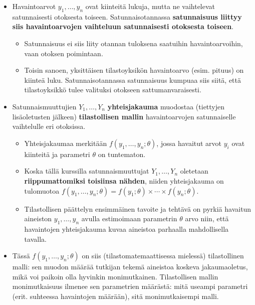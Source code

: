 \documentclass[
]{book}
\providecommand{\tightlist}{%
  \setlength{\itemsep}{0pt}\setlength{\parskip}{0pt}}
\begin{document}
\begin{itemize}
\tightlist
\item
  Havaintoarvot \(y_1, \dots, y_n\) ovat kiinteitä lukuja, mutta ne vaihtelevat satunnaisesti otoksesta toiseen. Satunnaisotannassa \textbf{satunnaisuus liittyy siis havaintoarvojen vaihteluun satunnaisesti otoksesta toiseen}.

  \begin{itemize}
  \tightlist
  \item
    Satunnaisuus ei siis liity otannan tuloksena saatuihin havaintoarvoihin, vaan otoksen poimintaan.
  \item
    Toisin sanoen, yksittäisen tilastoyksikön havaintoarvo (esim. pituus) on kiinteä luku. Satunnaisotannassa satunnaisuus kumpuaa siis siitä, että tilastoyksikkö tulee valituksi otokseen sattumanvaraisesti.
  \end{itemize}
\item
  Satunnaismuuttujien \(Y_1, \ldots, Y_n\) \textbf{yhteisjakauma} muodostaa (tiettyjen lisäoletusten jälkeen) \textbf{tilastollisen mallin} havaintoarvojen satunnaiselle vaihtelulle eri otoksissa.

  \begin{itemize}
  \tightlist
  \item
    Yhteisjakaumaa merkitään \(f(y_1,\dots,y_n;\theta)\), jossa havaitut arvot \(y_i\) ovat kiinteitä ja parametri \(\theta\) on tuntematon.
  \item
    Koska tällä kurssilla satunnaismuuttujat \(Y_1, \ldots, Y_n\) oletetaan \textbf{riippumattomiksi toisiinsa nähden}, niiden yhteisjakauma on tulomuotoa \(f(y_1, \ldots, y_n; \theta) = f(y_1; \theta) \times \cdots \times f(y_n; \theta)\).
  \item
    Tilastollisen päättelyn ensimmäinen tavoite ja tehtävä on pyrkiä havaitun aineiston \(y_1,\dots,y_n\) avulla estimoimaan parametrin \(\theta\) arvo niin, että havaintojen yhteisjakauma kuvaa aineistoa parhaalla mahdollisella tavalla.
  \end{itemize}
\item
  Tässä \(f(y_1, \ldots, y_n; \theta)\) on siis (tilastomatemaattisessa mielessä) tilastollinen malli: sen muodon määrää tutkijan tekemä aineistoa koskeva jakaumaoletus, mikä voi paikoin olla hyvinkin monimutkainen. Tilastollisen mallin monimutkaisuus ilmenee sen parametrien määrästä: mitä useampi parametri (erit. suhteessa havaintojen määrään), sitä monimutkaisempi malli.


\end{itemize}
\end{document}
